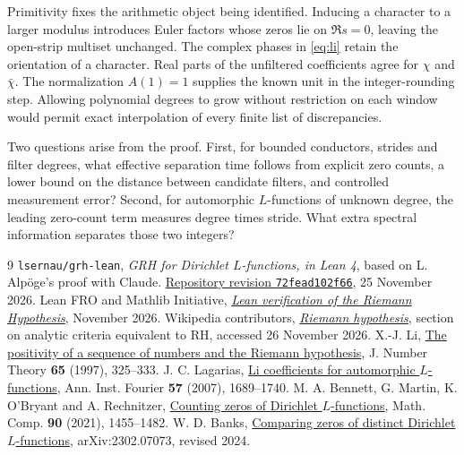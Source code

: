 \documentclass[11pt]{article}
\begin{document}
Primitivity fixes the arithmetic object being identified. Inducing a character to a larger modulus introduces Euler factors whose zeros lie on $\Re s=0$, leaving the open-strip multiset unchanged. The complex phases in \eqref{eq:li} retain the orientation of a character. Real parts of the unfiltered coefficients agree for $\chi$ and $\bar\chi$. The normalization $A(1)=1$ supplies the known unit in the integer-rounding step. Allowing polynomial degrees to grow without restriction on each window would permit exact interpolation of every finite list of discrepancies.

Two questions arise from the proof. First, for bounded conductors, strides and filter degrees, what effective separation time follows from explicit zero counts, a lower bound on the distance between candidate filters, and controlled measurement error? Second, for automorphic $L$-functions of unknown degree, the leading zero-count term measures degree times stride. What extra spectral information separates those two integers?

\begin{thebibliography}{9}\small
{} \texttt{lsernau/grh-lean}, \emph{GRH for Dirichlet $L$-functions, in Lean 4}, based on L. Alp\"oge's proof with Claude. \href{https://github.com/lsernau/grh-lean/tree/72fead102f663d5c7a407964a13dc0cf9d977207}{Repository revision \texttt{72fead102f66}}, 25 November 2026.
 Lean FRO and Mathlib Initiative, \href{https://leanprover-community.github.io/blog/posts/riemann-hypothesis/}{\emph{Lean verification of the Riemann Hypothesis}}, November 2026.
 Wikipedia contributors, \href{https://en.wikipedia.org/wiki/Riemann_hypothesis}{\emph{Riemann hypothesis}}, section on analytic criteria equivalent to RH, accessed 26 November 2026.
 X.-J. Li, \href{https://doi.org/10.1006/jnth.1997.2137}{The positivity of a sequence of numbers and the Riemann hypothesis}, J. Number Theory \textbf{65} (1997), 325--333.
 J. C. Lagarias, \href{https://doi.org/10.5802/aif.2311}{Li coefficients for automorphic $L$-functions}, Ann. Inst. Fourier \textbf{57} (2007), 1689--1740.
 M. A. Bennett, G. Martin, K. O'Bryant and A. Rechnitzer, \href{https://arxiv.org/abs/2005.02989}{Counting zeros of Dirichlet $L$-functions}, Math. Comp. \textbf{90} (2021), 1455--1482.
 W. D. Banks, \href{https://arxiv.org/abs/2302.07073}{Comparing zeros of distinct Dirichlet $L$-functions}, arXiv:2302.07073, revised 2024.
\end{thebibliography}
\end{document}
